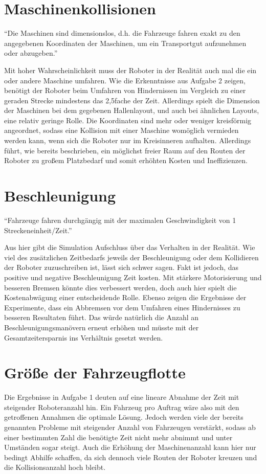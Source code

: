 \documentclass[ngerman]{tudscrreprt}
\begin{document}
\section{Maschinenkollisionen}
\begin{displayquote}
    ``Die Maschinen sind dimensionslos, d.h. die Fahrzeuge fahren exakt zu den angegebenen Koordinaten der Maschinen, um ein Transportgut aufzunehmen oder abzugeben.'' \cite{aufgabenstellung}
\end{displayquote}
%
Mit hoher Wahrscheinlichkeit muss der Roboter in der Realität auch mal die ein oder andere Maschine umfahren. Wie die Erkenntnisse aus Aufgabe 2 zeigen, benötigt der Roboter beim Umfahren von Hindernissen im Vergleich zu einer geraden Strecke mindestens das 2,5fache der Zeit. Allerdings spielt die Dimension der Maschinen bei dem gegebenen Hallenlayout, und auch bei ähnlichen Layouts, eine relativ geringe Rolle. Die Koordinaten sind mehr oder weniger kreisförmig angeordnet, sodass eine Kollision mit einer Maschine womöglich vermieden werden kann, wenn sich die Roboter nur im Kreisinneren aufhalten. Allerdings führt, wie bereits beschrieben, ein möglichst freier Raum auf den Routen der Roboter zu großem Platzbedarf und somit erhöhten Kosten und Ineffizienzen.

\section{Beschleunigung}
\begin{displayquote}
    ``Fahrzeuge fahren durchgängig mit der maximalen Geschwindigkeit von 1 Streckeneinheit/Zeit.'' \cite{aufgabenstellung}
\end{displayquote}
%
Aus hier gibt die Simulation Aufschluss über das Verhalten in der Realität. Wie viel des zusätzlichen Zeitbedarfs jeweils der Beschleunigung oder dem Kollidieren der Roboter zuzuschreiben ist, lässt sich schwer sagen. Fakt ist jedoch, das positive und negative Beschleunigung Zeit kosten. Mit stärkere Motorisierung und besseren Bremsen könnte dies verbessert werden, doch auch hier spielt die Kostenabwägung einer entscheidende Rolle. Ebenso zeigen die Ergebnisse der Experimente, dass ein Abbremsen vor dem Umfahren eines Hindernisses zu besseren Resultaten führt. Das würde natürlich die Anzahl an Beschleunigungsmanövern erneut erhöhen und müsste mit der Gesamtzeitersparnis ins Verhältnis gesetzt werden.

\section{Größe der Fahrzeugflotte}
Die Ergebnisse in Aufgabe 1 deuten auf eine lineare Abnahme der Zeit mit steigender Roboteranzahl hin. Ein Fahrzeug pro Auftrag wäre also mit den getroffenen Annahmen die optimale Lösung. Jedoch werden viele der bereits genannten Probleme mit steigender Anzahl von Fahrzeugen verstärkt, sodass ab einer bestimmten Zahl die benötigte Zeit nicht mehr abnimmt und unter Umständen sogar steigt. Auch die Erhöhung der Maschinenanzahl kann hier nur bedingt Abhilfe schaffen, da sich dennoch viele Routen der Roboter kreuzen und die Kollisionsanzahl hoch bleibt.



\end{document}

